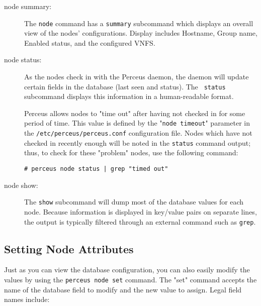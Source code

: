 \documentclass[10pt,letterpaper]{report}
\begin{document}
\begin{description}

\item[node summary:]  The {\tt node} command has a {\tt summary} subcommand
which displays an overall view of the nodes' configurations.  Display
includes Hostname, Group name, Enabled status, and the configured VNFS.

\item[node status:]  As the nodes check in with the Perceus daemon, the daemon
will update certain fields in the database (last seen and status).  The {\tt
status} subcommand displays this information in a human-readable format.

Perceus allows nodes to "time out" after having not checked in for some period
of time.  This value is defined by the "{\tt node timeout}"
parameter in the {\tt /etc/perceus/perceus.conf} configuration file.  Nodes
which have not checked in recently enough will be noted in the {\tt status}
command output; thus, to check for these "problem" nodes, use the following
command:

\begin{verbatim}
# perceus node status | grep "timed out"
\end{verbatim}


\item[node show:]  The {\tt show} subcommand will dump most of the database
values for each node.  Because information is displayed in key/value pairs on
separate lines, the output is typically filtered through an external command
such as {\tt grep}.

\end{description}

\subsection{Setting Node Attributes}

Just as you can view the database configuration, you can also easily modify
the values by using the {\tt perceus node set} command.  The "set" command
accepts the name of the database field to modify and the new value to assign.
Legal field names include:
\end{document}
